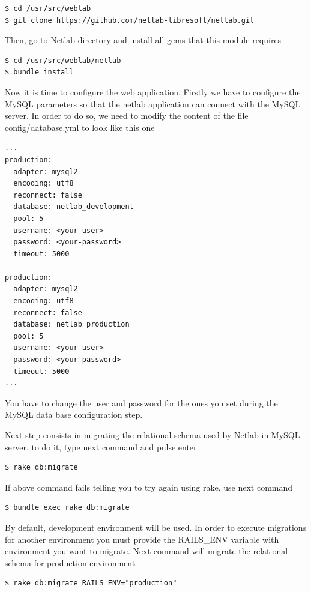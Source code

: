 \documentclass{article}
\begin{document}
\begin{verbatim}
$ cd /usr/src/weblab
$ git clone https://github.com/netlab-libresoft/netlab.git
\end{verbatim}

Then, go to Netlab directory and install all gems that this module requires

\begin{verbatim}
$ cd /usr/src/weblab/netlab
$ bundle install
\end{verbatim}

Now it is time to configure the web application. Firstly we have to configure the MySQL parameters so that the netlab application can connect with the MySQL server. In order to do so, we need to modify the content of the file config/database.yml to look like this one

\begin{verbatim}
...
production:
  adapter: mysql2
  encoding: utf8
  reconnect: false
  database: netlab_development
  pool: 5
  username: <your-user>
  password: <your-password>
  timeout: 5000

production:
  adapter: mysql2
  encoding: utf8
  reconnect: false
  database: netlab_production
  pool: 5
  username: <your-user>
  password: <your-password>
  timeout: 5000
...
\end{verbatim}

You have to change the user and password for the ones you set during the MySQL data base configuration step.

Next step consists in migrating the relational schema used by Netlab in MySQL server, to do it, type next command and pulse enter

\begin{verbatim}
$ rake db:migrate
\end{verbatim}

If above command fails telling you to try again using rake, use next command

\begin{verbatim}
$ bundle exec rake db:migrate
\end{verbatim}

By default, development environment will be used. In order to execute migrations for another environment you must provide the RAILS\_ENV variable with environment you want to migrate. Next command will migrate the relational schema for production environment
\begin{verbatim}
$ rake db:migrate RAILS_ENV="production"
\end{verbatim}
\end{document}
